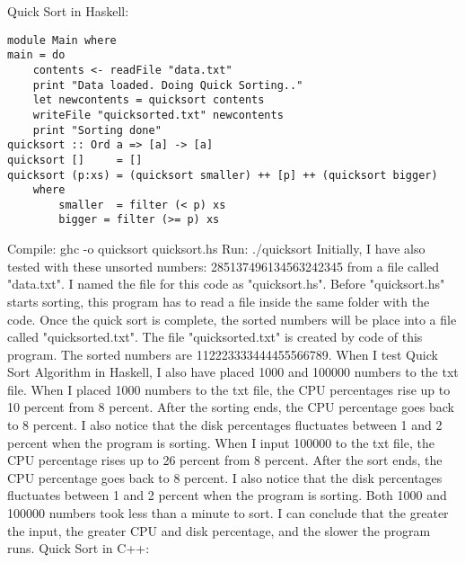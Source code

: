 \documentclass{article}
\begin{document}
\newline \newline Quick Sort in Haskell:
\begin{lstlisting}
module Main where
main = do
    contents <- readFile "data.txt"
    print "Data loaded. Doing Quick Sorting.."
    let newcontents = quicksort contents
    writeFile "quicksorted.txt" newcontents
    print "Sorting done"
quicksort :: Ord a => [a] -> [a]
quicksort []     = []
quicksort (p:xs) = (quicksort smaller) ++ [p] ++ (quicksort bigger)
    where
        smaller  = filter (< p) xs
        bigger = filter (>= p) xs
 \end{lstlisting}
 Compile: ghc -o quicksort quicksort.hs
 \newline Run: ./quicksort
\newline \newline Initially, I have also tested with these unsorted numbers: 285137496134563242345 from a file called "data.txt". I named the file for this code as "quicksort.hs". Before "quicksort.hs" starts sorting, this program has to read a file inside the same folder with the code. Once the quick sort is complete, the sorted numbers will be place into a file called "quicksorted.txt". The file "quicksorted.txt" is created by code of this program. The sorted numbers are 112223333444455566789.
\newline \newline When I test Quick Sort Algorithm in Haskell, I also have placed 1000 and 100000 numbers to the txt file. When I placed 1000 numbers to the txt file, the CPU percentages rise up to 10 percent from 8 percent. After the sorting ends, the CPU percentage goes back to 8 percent. I also notice that the disk percentages fluctuates between 1 and 2 percent when the program is sorting. When I input 100000 to the txt file, the CPU percentage rises up to 26 percent from 8 percent. After the sort ends, the CPU percentage goes back to 8 percent. I also notice that the disk percentages fluctuates between 1 and 2 percent when the program is sorting. Both 1000 and 100000 numbers took less than a minute to sort. I can conclude that the greater the input, the greater CPU and disk percentage, and the slower the program runs.
\newline \newline Quick Sort in C++:
\end{document}
